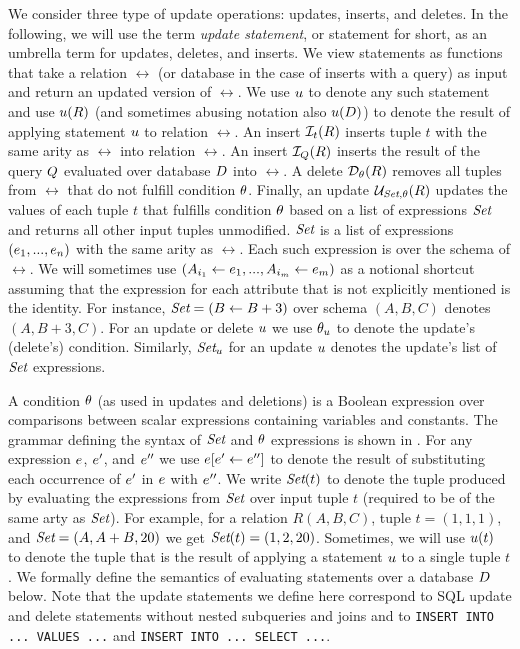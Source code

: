 We consider three type of update operations: updates, inserts, and deletes. In the following, we will use the term \textit{update statement}, or statement for short, as an umbrella term for updates, deletes, and inserts. We view statements as functions that take a relation $\rel$ (or database in the case of inserts with a query) as input and return an updated version of $\rel$. We use $u$ to denote any such statement and use $u(R)$ (and sometimes abusing notation also $u(D)$) to denote the result of applying statement $u$ to relation $\rel$. An insert $\mathcal{I}_{t}(R)$ inserts tuple $t$ with the same arity as $\rel$ into relation $\rel$. An insert $\mathcal{I}_{Q}(R)$ inserts the result of the query $Q$ evaluated over database $D$ into $\rel$. A delete $\mathcal{D}_{\theta}(R)$ removes all tuples from $\rel$ that do not fulfill condition $\theta$. Finally, an update $\mathcal{U}_{\textit{Set},\theta}(R)$ updates the values of each tuple $t$ that fulfills condition $\theta$ based on a list of expressions $\textit{Set}$ and returns all other input tuples unmodified. $\textit{Set}$ is a list of expressions $(e_1,...,e_n)$ with the same arity as $\rel$. Each such expression is over the schema of $\rel$. We will sometimes use $(A_{i_1}\leftarrow e_1,...,A_{i_m}\leftarrow e_m)$ as a notional shortcut assuming that the expression for each attribute that is not explicitly mentioned is the identity. For instance, $\textit{Set} = (B \leftarrow B + 3)$ over schema $(A,B,C)$ denotes $(A, B + 3, C)$. For an update or delete $u$ we use $\theta_{u}$ to denote the update's (delete's) condition. Similarly, $\textit{Set}_{u}$ for an update $u$ denotes the update's list of $\textit{Set}$ expressions.





A condition $\theta$ (as used in updates and deletions) is a Boolean expression over 
comparisons between scalar expressions containing variables and constants. The grammar defining the syntax of $\textit{Set}$ and $\theta$ expressions is shown in . For any expression $e$, $e'$, and $e''$ we use ${e}[e' \gets e'']$ to denote the result of substituting each occurrence of $e'$ in $e$ with $e''$. We write $\textit{Set}(t)$ to denote the tuple produced by evaluating the expressions from $\textit{Set}$ over input tuple $t$ (required to be of the same arty as $\textit{Set}$). For example, for a relation $R(A, B, C)$, tuple $t = (1, 1, 1)$, and  $\textit{Set} = (A, A + B, 20)$ we get $\textit{Set}(t) = (1, 2, 20)$. 
Sometimes, we will use $u(t)$ to denote the tuple that is the result of applying a statement $u$ to a single tuple $t$.
We formally define the semantics of evaluating statements over a database $D$ below. Note that the update statements we define here correspond to SQL update and delete statements without nested subqueries and joins and to \lstinline!INSERT INTO ... VALUES ...! and \lstinline!INSERT INTO ... SELECT ...!.



